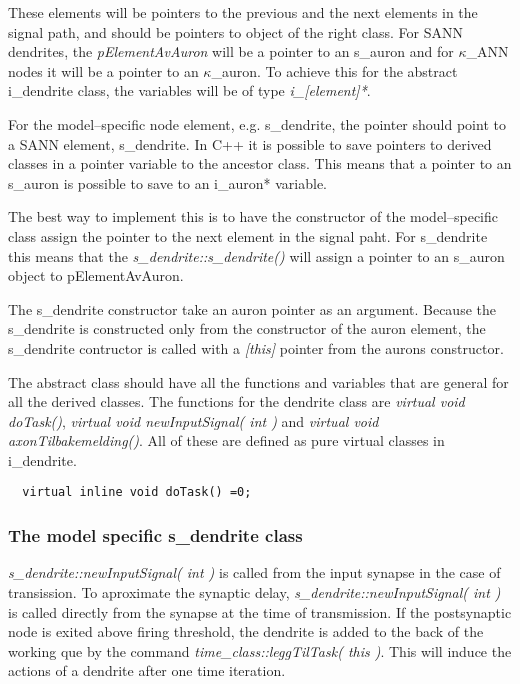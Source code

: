 	These elements will be pointers to the previous and the next elements in the signal path, and should be pointers to object of the right class. 
	For SANN dendrites, the \emph{pElementAvAuron} will be a pointer to an s\_auron and for $\kappa$\_ANN nodes it will be a pointer to an $\kappa$\_auron. 
	To achieve this for the abstract i\_dendrite class, the variables will be of type \emph{i\_[element]*}. %

	For the model--specific node element, e.g. s\_dendrite, the pointer should point to a SANN element, s\_dendrite. In C++ it is possible to save pointers to derived classes in a pointer variable to the ancestor class.
	This means that a pointer to an s\_auron is possible to save to an i\_auron* variable.

	The best way to implement this is to have the constructor of the model--specific class assign the pointer to the next element in the signal paht. 
	For s\_dendrite this means that the \emph{s\_dendrite::s\_dendrite()} will assign a pointer to an s\_auron object to pElementAvAuron.

	The s\_dendrite constructor take an auron pointer as an argument. 
	Because the s\_dendrite is constructed only from the constructor of the auron element, the s\_dendrite contructor is called with a \emph{[this]} pointer from the aurons constructor.

	The abstract class should have all the functions and variables that are general for all the derived classes. 
	The functions for the dendrite class are \emph{virtual void doTask()}, \emph{virtual void newInputSignal( int )} and \emph{virtual void axonTilbakemelding()}. 
	All of these are defined as pure virtual classes in i\_dendrite.

\begin{lstlisting}
  virtual inline void doTask() =0;
\end{lstlisting}

	\subsubsection{The model specific s\_dendrite class}
	
	\emph{s\_dendrite::newInputSignal( int )} is called from the input synapse in the case of transission. 
	To aproximate the synaptic delay, \emph{s\_dendrite::newInputSignal( int )} is called directly from the synapse at the time of transmission.
	If the postsynaptic node is exited above firing threshold, the dendrite is added to the back of the working que by the command \emph{time\_class::leggTilTask( this )}. 
	This will induce the actions of a dendrite after one time iteration.

